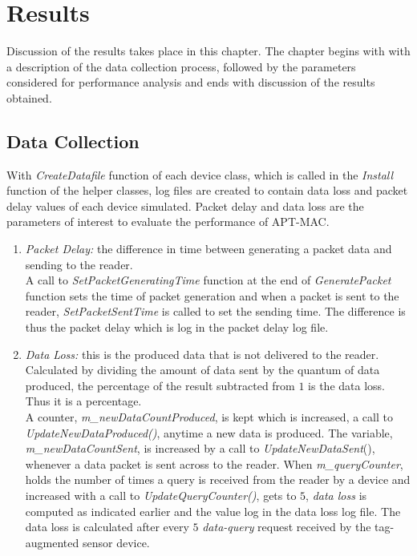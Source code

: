 \chapter{Results}
Discussion of the results takes place in this chapter. The chapter begins with
with a description of the data collection process, followed by the parameters
considered for performance analysis and ends with discussion of the results obtained.

\section{Data Collection}
With \textit{CreateDatafile} function of each device class, which is called in the
\textit{Install} function of the helper classes, log files are created to contain
data loss and packet delay values of each device simulated. Packet delay and data
loss are the parameters of interest to evaluate the performance of APT-MAC.
\begin{enumerate}
    \renewcommand{\labelenumi}{}
\item \textit{Packet Delay:} the difference in time between generating a packet data
    and sending to the reader.\\
    A call to \textit{SetPacketGeneratingTime} function at the end of
    \textit{GeneratePacket} function sets the time of packet generation and when a
    packet is sent to the reader, \textit{SetPacketSentTime} is called to set the
    sending time. The difference is thus the packet delay which is log in the packet
    delay log file.
\item \textit{Data Loss:} this is the produced data that is not delivered to the
    reader. Calculated by dividing the amount of data sent by the quantum of data
    produced, the percentage of the result subtracted from $1$ is the data loss.
    Thus it is a percentage.\\
    A counter, \textit{m\_newDataCountProduced}, is kept which is increased,
    a call to \textit{UpdateNewDataProduced()}, anytime a new data is
    produced. The variable, \textit{m\_newDataCountSent}, is increased by a call to
    \textit{UpdateNewDataSent}(), whenever a data packet is sent across to
    the reader. When \textit{m\_queryCounter}, holds the number of
    times a query is received from the reader by a device and increased with a call
    to \textit{UpdateQueryCounter()}, gets to $5$, \textit{data loss} is computed
    as indicated earlier and the value log in the data loss log file. The data loss
    is calculated after every $5$ \textit{data-query} request received by the
    tag-augmented sensor device.
\end{enumerate}
